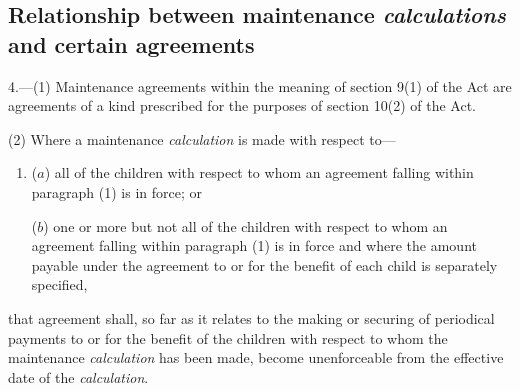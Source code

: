 \documentclass[12pt,a4paper]{article}
\begin{document}
%


\subsection[4. Relationship between maintenance 
\emph{calculations} 
and certain agreements]{\sloppy Relationship between maintenance %
\emph{calculations} 
and certain agreements}

4.—(1) Maintenance agreements within the meaning of section 9(1) of the Act are agreements of a kind prescribed for the purposes of section 10(2) of the Act.

(2) Where a maintenance 
\emph{calculation} 
is made with respect to—
\begin{enumerate}\item[]
($a$) all of the children with respect to whom an agreement falling within paragraph (1) is in force; or

($b$) one or more but not all of the children with respect to whom an agreement falling within paragraph (1) is in force and where the amount payable under the agreement to or for the benefit of each child is separately specified,
\end{enumerate}
that agreement shall, so far as it relates to the making or securing of periodical payments to or for the benefit of the children with respect to whom the maintenance 
\emph{calculation} 
has been made, become unenforceable from the effective date of the 
\emph{calculation}.
\end{document}
